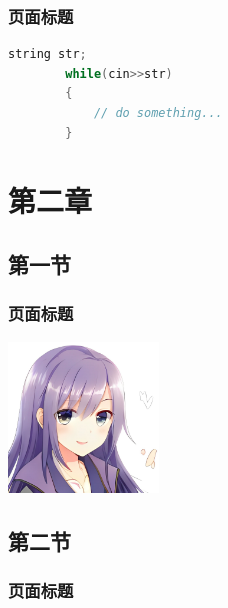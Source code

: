 \documentclass[aspectratio=169]{beamer} %
\begin{document}
\begin{frame}[fragile]
    \frametitle{页面标题}
    \begin{lstlisting}[language=C++]
        string str;
        while(cin>>str)
        {
            // do something...
        }
    \end{lstlisting}

\end{frame}

\section{第二章}

\subsection{第一节}

\begin{frame}
    \frametitle{页面标题}

    \includegraphics[height=4cm]{pic.jpg} %


\end{frame}

\subsection{第二节}

\begin{frame}
    \frametitle{页面标题}
\end{frame}
\end{document}
